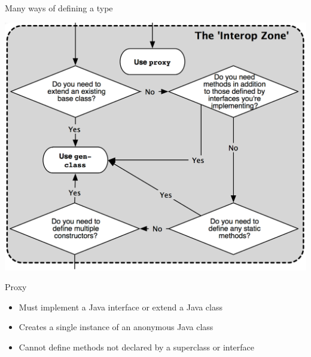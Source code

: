 \documentclass[xcolor=dvipsnames]{beamer}
\begin{document}
		\begin{frame}{Many ways of defining a type}
		\begin{center}
			\includegraphics[scale=.2]{choosingtypeformszoom.png}
		\end{center}
		\end{frame}
		

	
	\begin{frame}{Proxy}
	\begin{itemize}
	\item Must implement a Java interface or extend a Java class
	\item Creates a single instance of an anonymous Java class
	\item Cannot define methods not declared by a superclass or interface
	\end{itemize}
	\end{frame}	

	
\end{document}
